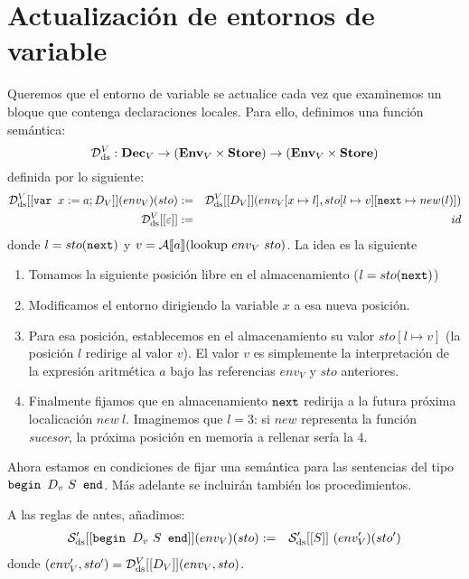 \section{Actualización de entornos de variable}

Queremos que el entorno de variable se actualice cada vez que examinemos un bloque que contenga declaraciones locales. Para ello, definimos una función semántica:
$$\mathcal{D}_{\mathrm{ds}}^V: \mathbf{Dec}_V \to (\mathbf{Env}_V \times \mathbf{Store})\to (\mathbf{Env}_V \times \mathbf{Store})$$
definida por lo siguiente:
\begin{eqnarray*}
    \mathcal{D}_{\mathrm{ds}}^V [[\texttt{var } x:=a; D_V]](env_V)(sto) &:=& \mathcal{D}_{\mathrm{ds}}^V[[D_V]](env_V[x\mapsto l], sto[l\mapsto v][\texttt{next}\mapsto new(l)])\\
    \mathcal{D}_{\mathrm{ds}}^V [[\varepsilon]] &:=& id
\end{eqnarray*}
donde $l = sto(\texttt{next})$ y $v = \mathcal{A}[\![a]\!](\mathrm{lookup}\ env_V\ sto)$. La idea es la siguiente
\begin{enumerate}
    \item Tomamos la siguiente posición libre en el almacenamiento ($l = sto(\texttt{next})$)
    \item Modificamos el entorno dirigiendo la variable $x$ a esa nueva posición.
    \item Para esa posición, establecemos en el almacenamiento su valor $sto[l\mapsto v]$ (la posición $l$ redirige al valor $v$). El valor $v$ es simplemente la interpretación de la expresión aritmética $a$ bajo las referencias $env_V$ y $sto$ anteriores.
    \item Finalmente fijamos que en almacenamiento $\texttt{next}$ redirija a la futura próxima localicación $new\ l$. Imaginemos que $l = 3$: si $new$ representa la función \textit{sucesor}, la próxima posición en memoria a rellenar sería la $4$.
\end{enumerate}
Ahora estamos en condiciones de fijar una semántica para las sentencias del tipo $\texttt{begin } D_v\ S \texttt{ end}$. Más adelante se incluirán también los procedimientos.
\begin{sist*}
A las reglas de antes, añadimos:
\begin{eqnarray*}
    \mathcal{S}'_{\mathrm{ds}} [[\texttt{begin } D_v\ S \texttt{ end}]](env_V)(sto) &:=&  \mathcal{S}'_{\mathrm{ds}} [[S]]\ (env_V')(sto')
\end{eqnarray*}
donde $(env_V', sto') = \mathcal{D}_{\mathrm{ds}}^V [[D_V]](env_V, sto)$.
\end{sist*}

